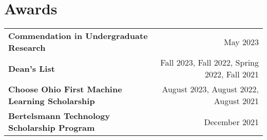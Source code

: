 \documentclass[letterpaper,10pt]{article} %
\begin{document}
\section{Awards}

\scriptsize{
\begin{tabular*}{\linewidth}{@{\extracolsep{\fill}} lr }
\textbf{Commendation in Undergraduate Research} & May 2023\\
\textbf{Dean's List} & Fall 2023, Fall 2022, Spring 2022, Fall 2021\\
\textbf{Choose Ohio First Machine Learning Scholarship} & August 2023, August 2022, August 2021\\
\textbf{Bertelsmann Technology Scholarship Program} & December 2021
\end{tabular*}}
\end{document}
